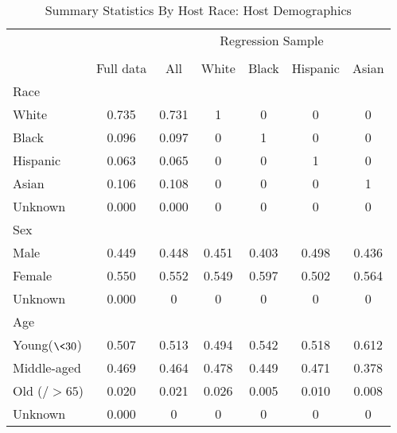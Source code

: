 \begin{table}[htbp]
\caption{Summary Statistics By Host Race: Host Demographics}
\begin{center}%
\small\begin{tabular}{l c | c | c c c c}
& \multicolumn{1}{c}{} & \multicolumn{5}{c}{Regression Sample}
\\
 \cmidrule(r){3-7}
\\
 & \multicolumn{1}{c}{Full data} & \multicolumn{1}{c}{All} & White & Black & Hispanic & Asian
\\
\hline\hline\noalign{\smallskip} 
 Race &&&&&& \\
 \hspace{10bp}White & 0.735 & 0.731 &     1 &    0 &     0 &    0 \\  \hspace{10bp}Black & 0.096 & 0.097 &     0 &    1 &     0 &    0 \\  \hspace{10bp}Hispanic & 0.063 & 0.065 &     0 &    0 &     1 &    0 \\  \hspace{10bp}Asian & 0.106 & 0.108 &     0 &    0 &     0 &    1 \\  \hspace{10bp}Unknown & 0.000 & {0.000} & {0} &  {0}  & {0}  & {0} \\  Sex &&&&&& \\
 \hspace{10bp}Male & 0.449 & 0.448 &  0.451 & 0.403 &  0.498 & 0.436 \\  \hspace{10bp}Female & 0.550 & 0.552 &  0.549 & 0.597 &  0.502 & 0.564 \\  \hspace{10bp}Unknown & 0.000 & {0} & {0} &  {0}  & {0}  & {0}\\  Age &&&&&& \\
 \hspace{10bp}Young($\<30$) & 0.507 & 0.513 &  0.494 & 0.542 &  0.518 & 0.612 \\  \hspace{10bp}Middle-aged & 0.469 & 0.464 &  0.478 & 0.449 &  0.471 & 0.378 \\  \hspace{10bp}Old ($/>65$) &              0.020 & 0.021 &  0.026 & 0.005 &  0.010 & 0.008 \\  \hspace{10bp}Unknown & 0.000 & {0} & {0} &  {0}  & {0}  & {0} \\ \hline

\end{tabular}
\end{center}
\end{table}
